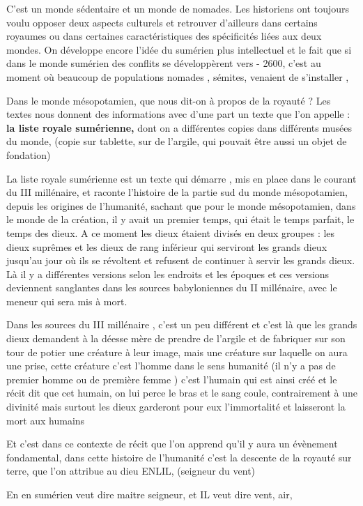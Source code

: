 \documentclass[a4paper,10pt]{article}
\begin{document}
C'est un monde sédentaire et un monde de nomades. Les
historiens ont toujours voulu opposer deux aspects culturels et
retrouver d'ailleurs dans certains royaumes ou dans
certaines caractéristiques des spécificités liées aux deux mondes. On
développe encore l'idée du sumérien plus intellectuel
et le fait que si dans le monde sumérien des conflits se développèrent
vers - 2600, c'est au moment où beaucoup de
populations nomades , sémites, venaient de s'installer
, 

Dans le monde mésopotamien, que nous dit-on  à propos de la royauté ?
Les textes nous donnent des informations avec d'une
part un texte que l'on appelle : \textbf{la liste
royale sumérienne, }dont on a différentes copies dans différents musées
du monde, (copie sur tablette, sur de l'argile, qui
pouvait être aussi un objet de fondation)

La liste royale sumérienne est un texte qui démarre , mis en place dans
le courant du III millénaire, et raconte l'histoire de
la partie sud du monde mésopotamien, depuis les origines de
l'humanité, sachant que pour le monde mésopotamien,
dans le monde de la création, il y avait un premier temps, qui était le
temps parfait, le temps des dieux. A ce moment les dieux étaient
divisés en deux groupes : les dieux suprêmes et les dieux de rang
inférieur qui serviront les grands dieux jusqu'au jour
où ils se révoltent et refusent de continuer à servir les grands dieux.
Là il y a différentes versions selon les endroits et les époques et ces
versions deviennent sanglantes dans les sources babyloniennes du II
millénaire, avec le meneur qui sera mis à mort.

Dans les sources du III millénaire , c'est un peu
différent et c'est là que les grands dieux demandent à
la déesse mère de prendre de l'argile et de fabriquer
sur son tour de potier une créature à leur image, mais une créature sur
laquelle on aura une prise, cette créature c'est
l'homme dans le sens humanité (il n'y
a pas de premier homme ou de première femme ) c'est
l'humain qui est ainsi créé et le récit dit que cet
humain, on lui perce le bras et le sang coule, contrairement à une
divinité mais surtout les dieux garderont pour eux
l'immortalité et laisseront la mort aux humains

Et c'est dans ce contexte de récit que
l'on apprend qu'il y aura un
évènement fondamental, dans cette histoire de
l'humanité c'est la descente de la
royauté sur terre, que l'on attribue au dieu ENLIL,
(seigneur du vent)

En en sumérien veut dire maitre seigneur, et IL veut dire vent, air, 
\end{document}

